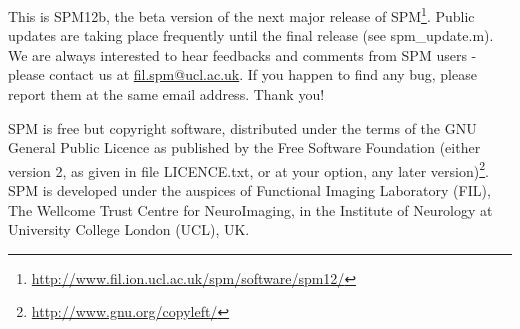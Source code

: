 \documentclass[a4paper,titlepage,openany]{article}
\begin{document}
\let\oldlabel=\label
\renewcommand{\label}[1]{
{\pdfdest name {#1} fit}
\oldlabel{#1}
}

\newlength{\centeroffset}
\setlength{\centeroffset}{-0.5\oddsidemargin}
\addtolength{\centeroffset}{0.5\evensidemargin}
\thispagestyle{empty}
\noindent\hspace*{\centeroffset}

\noindent\hspace*{\centeroffset}

\vspace{10mm}

This is SPM12b, the beta version of the next major release of SPM\footnote{\url{http://www.fil.ion.ucl.ac.uk/spm/software/spm12/}}.
Public updates are taking place frequently until the final release (see spm\_update.m).
We are always interested to hear feedbacks and comments from SPM users - please contact us at \href{mailto:fil.spm@ucl.ac.uk}{fil.spm@ucl.ac.uk}.
If you happen to find any bug, please report them at the same email address. Thank you!


SPM is free but copyright software, distributed under the terms of the GNU General Public Licence as published by the Free Software Foundation (either version 2, as given in file LICENCE.txt, or at your option, any later version)\footnote{\url{http://www.gnu.org/copyleft/}}. \\
SPM is developed under the auspices of Functional Imaging Laboratory (FIL), The Wellcome Trust Centre for NeuroImaging, in the Institute of Neurology at University College London (UCL), UK.
\end{document}
